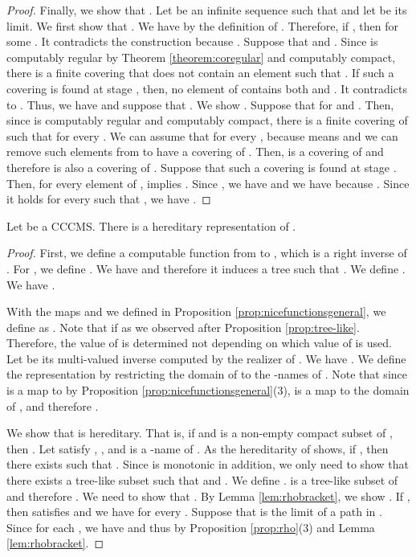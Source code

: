 \documentclass{eptcs-modified}
\begin{document}
\begin{proposition}
\begin{proof}
Finally, we show that .
Let  be an infinite sequence such that
 and let  be its limit.
We first show that .
We have  by the definition of .  Therefore, if , then  for some .   It contradicts the construction because .   Suppose that  and .
Since  is computably regular by Theorem \ref{theorem:coregular} and computably compact,
there is a finite covering  that does not contain an element  such that .
If such a covering is found at stage ,  then,  no element of  contains both  and .
It contradicts to .  Thus, we have
 and suppose that .  We show .
Suppose that   for  and . Then,
since  is computably regular and computably compact, there is a finite covering  of  such that  for every .
We can assume that  for every , because
 means  and  we can remove such elements from  to have a covering of
.
Then,  is a covering of  and therefore is also a covering of .
Suppose that such a covering is found at stage .  Then, for every element  of ,
 implies .  Since , we have  and
we have  because .
Since it holds for every  such that , we have .
\end{proof}
\end{proposition}

\begin{theorem}
\label{theo:hereditary}Let  be a CCCMS.
There is a hereditary representation of .
\begin{proof}
  First, we define a computable function  from  to , which is a right inverse of .
  For  , we define .
We have  and
therefore it induces a tree  such that .  We define .
We have .

With the maps  and 
we defined in Proposition \ref{prop:nicefunctionsgeneral},
we define  as
.
Note that
 if  as we observed
after Proposition \ref{prop:tree-like}.  Therefore,
the value of  is determined not depending on which value of 
is used.  Let  be its multi-valued inverse
computed by the realizer of .
We have .
We define the representation  by restricting
the domain of  to the -names of .
Note that since  is a map to 
by Proposition \ref{prop:nicefunctionsgeneral}(3),
 is a map to the domain of , and therefore .








We show that  is hereditary. That is, if
 and  is a non-empty compact subset of ,
then .
Let  satisfy ,
, and  is a -name of  .
As the hereditarity of  shows,
if , then there exists  such that
.
Since  is monotonic in addition, we only need to show that
there exists a tree-like subset  such that  and .
We define .
 is a tree-like subset of  and therefore .
We need to show that .
By Lemma \ref{lem:rhobracket}, we show
.
If , then  satisfies  and we have  for every .
Suppose that  is the limit of a path  in . Since  for each ,
we have  and thus  by Proposition \ref{prop:rho}(3) and
Lemma \ref{lem:rhobracket}.
\end{proof}
\end{theorem}
\end{document}
